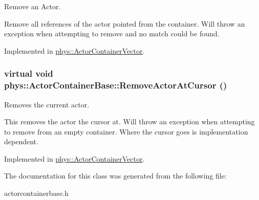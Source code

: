 Remove an Actor. 

Remove all references of the actor pointed from the container. Will throw an exception when attempting to remove and no match could be found. 

Implemented in \hyperlink{classphys_1_1ActorContainerVector_aeee5bd81601faed85e6a35f576c8d476}{phys::ActorContainerVector}.

\hypertarget{classphys_1_1ActorContainerBase_a60f37a056e8750f3b389c5ceed14520c}{
\subsubsection[{RemoveActorAtCursor}]{\setlength{\rightskip}{0pt plus 5cm}virtual void phys::ActorContainerBase::RemoveActorAtCursor ()}}
\label{d1/d00/classphys_1_1ActorContainerBase_a60f37a056e8750f3b389c5ceed14520c}


Removes the current actor. 

This removes the actor the cursor at. Will throw an exception when attempting to remove from an empty container. Where the cursor goes is implementation dependent. 

Implemented in \hyperlink{classphys_1_1ActorContainerVector_a430977daf010a25f53df6cf37954f8ca}{phys::ActorContainerVector}.



The documentation for this class was generated from the following file:\begin{DoxyCompactItemize}
\item 
actorcontainerbase.h\end{DoxyCompactItemize}
